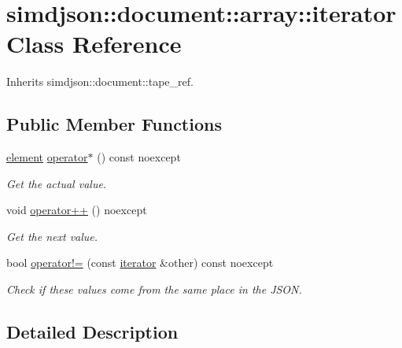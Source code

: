 \hypertarget{classsimdjson_1_1document_1_1array_1_1iterator}{}\section{simdjson\+:\+:document\+:\+:array\+:\+:iterator Class Reference}
\label{classsimdjson_1_1document_1_1array_1_1iterator}


Inherits simdjson\+::document\+::tape\+\_\+ref.

\subsection*{Public Member Functions}
\begin{DoxyCompactItemize}
\item 
\mbox{\label{classsimdjson_1_1document_1_1array_1_1iterator_a42bad0e3e35ecd7d1fc0c96bf7263978}} 
\hyperlink{classsimdjson_1_1document_1_1element}{element} \hyperlink{classsimdjson_1_1document_1_1array_1_1iterator_a42bad0e3e35ecd7d1fc0c96bf7263978}{operator$\ast$} () const noexcept
\begin{DoxyCompactList}\small\item\em Get the actual value. \end{DoxyCompactList}\item 
void \hyperlink{classsimdjson_1_1document_1_1array_1_1iterator_aa8458eb6195491a692a9fae5ca2508df}{operator++} () noexcept
\begin{DoxyCompactList}\small\item\em Get the next value. \end{DoxyCompactList}\item 
bool \hyperlink{classsimdjson_1_1document_1_1array_1_1iterator_a5cac863b65e9fc607d5ed7e5e2a2f35d}{operator!=} (const \hyperlink{classsimdjson_1_1document_1_1array_1_1iterator}{iterator} \&other) const noexcept
\begin{DoxyCompactList}\small\item\em Check if these values come from the same place in the J\+S\+ON. \end{DoxyCompactList}\end{DoxyCompactItemize}


\subsection{Detailed Description}


